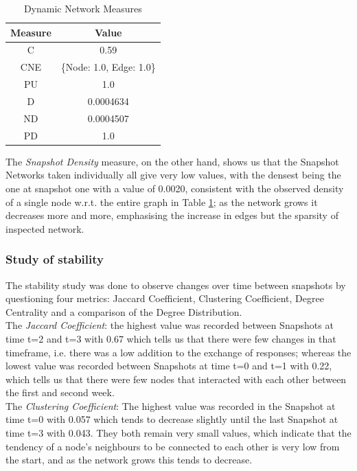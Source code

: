 \documentclass[sigchi]{acmart}
\begin{document}
\vspace{10pt}

\begin{table}[htbp]
\centering
\begin{tabular}{|c|c|}
\hline
\textbf{Measure} & \textbf{Value} \\ \hline
C & 0.59 \\ \hline
CNE & \{Node: 1.0, Edge: 1.0\} \\ \hline
PU & 1.0 \\ \hline
D & 0.0004634 \\ \hline
ND & 0.0004507 \\ \hline
PD & 1.0 \\ \hline
\end{tabular}
\caption{Dynamic Network Measures}
\label{tab:Dynamic Network Measures}
\end{table}


The \textit{Snapshot Density} measure, on the other hand, shows us that the Snapshot Networks taken individually all give very low values, with the densest being the one at snapshot one with a value of 0.0020, consistent with the observed density of a single node w.r.t. the entire graph in Table \ref{tab:Dynamic Network Measures}; as the network grows it decreases more and more, emphasising the increase in edges but the sparsity of inspected network.

\subsubsection{Study of stability} The stability study was done to observe changes over time between snapshots by questioning four metrics: Jaccard Coefficient, Clustering Coefficient, Degree Centrality and a comparison of the Degree Distribution.
\\

\noindent The \textit{Jaccard Coefficient}: the highest value was recorded between Snapshots at time t=2 and t=3 with 0.67 which tells us that there were few changes in that timeframe, i.e. there was a low addition to the exchange of responses; whereas the lowest value was recorded between Snapshots at time t=0 and t=1 with 0.22, which tells us that there were few nodes that interacted with each other between the first and second week.
\\

\noindent The \textit{Clustering Coefficient}: The highest value was recorded in the Snapshot at time t=0 with 0.057 which tends to decrease slightly until the last Snapshot at time t=3 with 0.043.
They both remain very small values, which indicate that the tendency of a node's neighbours to be connected to each other is very low from the start, and as the network grows this tends to decrease.
\\
\end{document}
